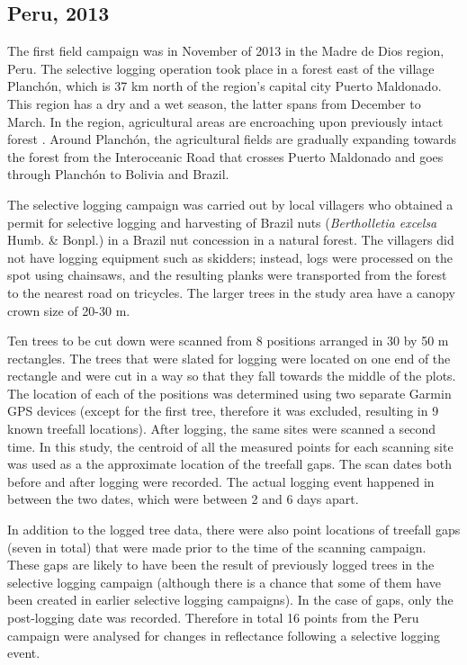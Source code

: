 \documentclass[a4paper,12pt]{scrbook}
\begin{document}
\subsection{Peru, 2013}

The first field campaign was in November of 2013 in the Madre de Dios region, Peru. The selective logging operation took place in a forest east of the village Planchón, which is 37 km north of the region's capital city Puerto Maldonado. This region has a dry and a wet season, the latter spans from December to March. In the region, agricultural areas are encroaching upon previously intact forest \citep{scullion_assessing_2014}. Around Planchón, the agricultural fields are gradually expanding towards the forest from the Interoceanic Road that crosses Puerto Maldonado and goes through Planchón to Bolivia and Brazil.

The selective logging campaign was carried out by local villagers who obtained a permit for selective logging and harvesting of Brazil nuts (\textit{Bertholletia excelsa} Humb. \& Bonpl.) in a Brazil nut concession in a natural forest. The villagers did not have logging equipment such as skidders; instead, logs were processed on the spot using chainsaws, and the resulting planks were transported from the forest to the nearest road on tricycles. The larger trees in the study area have a canopy crown size of 20-30 m.

Ten trees to be cut down were scanned from 8 positions arranged in 30 by 50 m rectangles. The trees that were slated for logging were located on one end of the rectangle and were cut in a way so that they fall towards the middle of the plots. The location of each of the positions was determined using two separate Garmin \ac{GPS} devices (except for the first tree, therefore it was excluded, resulting in 9 known treefall locations). After logging, the same sites were scanned a second time. In this study, the centroid of all the measured points for each scanning site was used as a the approximate location of the treefall gaps. The scan dates both before and after logging were recorded. The actual logging event happened in between the two dates, which were between 2 and 6 days apart.

In addition to the logged tree data, there were also point locations of treefall gaps (seven in total) that were made prior to the time of the scanning campaign. These gaps are likely to have been the result of previously logged trees in the selective logging campaign (although there is a chance that some of them have been created in earlier selective logging campaigns). In the case of gaps, only the post-logging date was recorded.  Therefore in total 16 points from the Peru campaign were analysed for changes in reflectance following a selective logging event.
\end{document}
